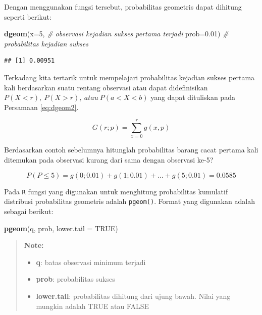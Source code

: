\documentclass[]{book}
\newenvironment{Shaded}{\begin{snugshade}}{\end{snugshade}}
\newcommand{\KeywordTok}[1]{\textcolor[rgb]{0.13,0.29,0.53}{\textbf{#1}}}
\newcommand{\DataTypeTok}[1]{\textcolor[rgb]{0.13,0.29,0.53}{#1}}
\newcommand{\DecValTok}[1]{\textcolor[rgb]{0.00,0.00,0.81}{#1}}
\newcommand{\FloatTok}[1]{\textcolor[rgb]{0.00,0.00,0.81}{#1}}
\newcommand{\CommentTok}[1]{\textcolor[rgb]{0.56,0.35,0.01}{\textit{#1}}}
\newcommand{\OtherTok}[1]{\textcolor[rgb]{0.56,0.35,0.01}{#1}}
\newcommand{\NormalTok}[1]{#1}
\providecommand{\tightlist}{%
  \setlength{\itemsep}{0pt}\setlength{\parskip}{0pt}}
\begin{document}
Dengan menggunakan fungsi tersebut, probabilitas geometris dapat
dihitung seperti berikut:

\begin{Shaded}
\begin{Highlighting}[]
\KeywordTok{dgeom}\NormalTok{(}\DataTypeTok{x=}\DecValTok{5}\NormalTok{, }\CommentTok{# observasi kejadian sukses pertama terjadi}
      \DataTypeTok{prob=}\FloatTok{0.01}\NormalTok{) }\CommentTok{# probabilitas kejadian sukses}
\end{Highlighting}
\end{Shaded}

\begin{verbatim}
## [1] 0.00951
\end{verbatim}

Terkadang kita tertarik untuk mempelajari probabilitas kejadian sukses
pertama kali berdasarkan suatu rentang observasi atau dapat
didefinisikan
\(P\left(X<r\right),\ P\left(X>r\right),\ atau\ P\left(a<X<b\right)\)
yang dapat dituliskan pada Persamaan \eqref{eq:dgeom2}.

\begin{equation}
   G\left(r;p\right)=\sum _{x=0}^rg\left(x,p\right)
  \label{eq:dgeom2}
\end{equation}

Berdasarkan contoh sebelumnya hitunglah probabilitas barang cacat
pertama kali ditemukan pada observasi kurang dari sama dengan observasi
ke-5?

\[
P\left(P\le5\right)=g\left(0;0.01\right)+g\left(1;0.01\right)+...+g\left(5;0.01\right)=0.0585
\]

Pada \texttt{R} fungsi yang digunakan untuk menghitung probabilitas
kumulatif distribusi probabilitas geometris adalah \texttt{pgeom()}.
Format yang digunakan adalah sebagai berikut:

\begin{Shaded}
\begin{Highlighting}[]
\KeywordTok{pgeom}\NormalTok{(q, prob, }\DataTypeTok{lower.tail =} \OtherTok{TRUE}\NormalTok{)}
\end{Highlighting}
\end{Shaded}

\begin{quote}
\textbf{Note: }

\begin{itemize}
\tightlist
\item
  \textbf{q}: batas observasi minimum terjadi
\item
  \textbf{prob}: probabilitas sukses
\item
  \textbf{lower.tail}: probabilitas dihitung dari ujung bawah. Nilai
  yang mungkin adalah TRUE atau FALSE
\end{itemize}
\end{quote}
\end{document}
